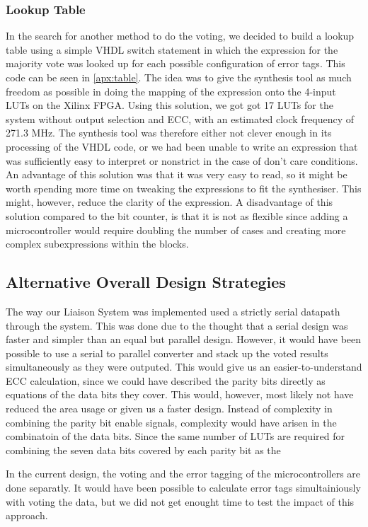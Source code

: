 \subsubsection{Lookup Table}
In the search for another method to do the voting, we decided to build
a lookup table using a simple VHDL switch statement in which the
expression for the majority vote was looked up for each possible
configuration of error tags. This code can be seen in
\autoref{apx:table}. The idea was to give the synthesis tool as much
freedom as possible in doing the mapping of the expression onto the
4-input LUTs on the Xilinx FPGA. Using this solution, we got got 17
LUTs for the system without output selection and ECC, with an
estimated clock frequency of 271.3 MHz. The synthesis tool was
therefore either not clever enough in its processing of the VHDL code,
or we had been unable to write an expression that was sufficiently
easy to interpret or nonstrict in the case of don't care
conditions. An advantage of this solution was that it was very easy to
read, so it might be worth spending more time on tweaking the
expressions to fit the synthesiser. This might, however, reduce the
clarity of the expression. A disadvantage of this solution compared to
the bit counter, is that it is not as flexible since adding a
microcontroller would require doubling the number of cases and
creating more complex subexpressions within the blocks.

\subsection{Alternative Overall Design Strategies}
The way our Liaison System was implemented used a strictly serial
datapath through the system. This was done due to the thought that a
serial design was faster and simpler than an equal but parallel
design. However, it would have been possible to use a serial to
parallel converter and stack up the voted results simultaneously as
they were outputed. This would give us an easier-to-understand ECC
calculation, since we could have described the parity bits directly as
equations of the data bits they cover. This would, however, most
likely not have reduced the area usage or given us a faster
design. Instead of complexity in combining the parity bit enable
signals, complexity would have arisen in the combinatoin of the data
bits. Since the same number of LUTs are required for combining the
seven data bits covered by each parity bit as the 

In the current design, the voting and the error tagging of the
microcontrollers are done separatly. It would have been possible to
calculate error tags simultainiously with voting the data, but we did
not get enought time to test the impact of this approach.

